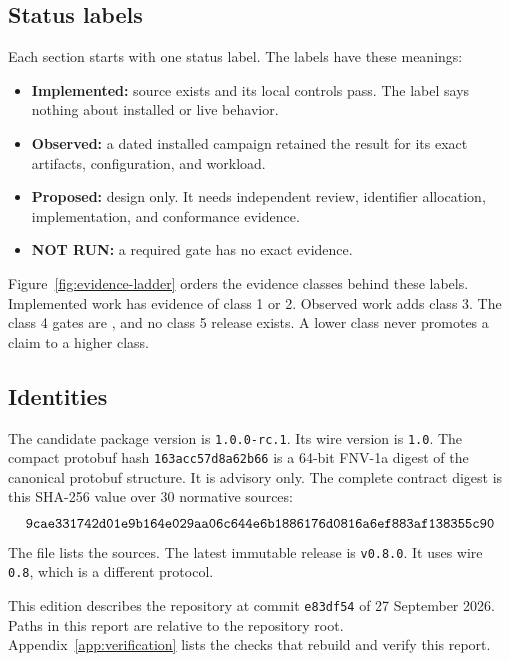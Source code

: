 \documentclass[11pt,a4paper]{article}
\theoremstyle{definition}
\let\NcpTextttBase\texttt
\renewcommand{\texttt}[1]{\mbox{\NcpTextttBase{#1}}}
\begin{document}
\subsection{Status labels}

Each section starts with one status label. The labels have these meanings:
\begin{itemize}[leftmargin=*]
  \item \textbf{Implemented:} source exists and its local controls pass. The label says
        nothing about installed or live behavior.
  \item \textbf{Observed:} a dated installed campaign retained the result for its exact
        artifacts, configuration, and workload.
  \item \textbf{Proposed:} design only. It needs independent review, identifier
        allocation, implementation, and conformance evidence.
  \item \textbf{NOT RUN:} a required gate has no exact evidence.
\end{itemize}
Figure~\ref{fig:evidence-ladder} orders the evidence classes behind these labels.
Implemented work has evidence of class 1 or 2. Observed work adds class 3. The class 4
gates are \NcpNotRun, and no class 5 release exists. A lower class never promotes a claim
to a higher class.


\subsection{Identities}

The candidate package version is \texttt{1.0.0-rc.1}. Its wire version is \texttt{1.0}.
The compact protobuf hash \texttt{163acc57d8a62b66} is a 64-bit FNV-1a digest of the
canonical protobuf structure. It is advisory only. The complete contract digest is this
SHA-256 value over 30 normative sources:
\[
\texttt{9cae331742d01e9b164e029aa06c644e6b1886176d0816a6ef883af138355c90}
\]
The file  lists the sources. The latest immutable release
is \texttt{v0.8.0}. It uses wire \texttt{0.8}, which is a different protocol.

This edition describes the repository at commit \texttt{e83df54} of 27 September 2026.
Paths in this report are relative to the repository root. Appendix~\ref{app:verification}
lists the checks that rebuild and verify this report.
\end{document}
